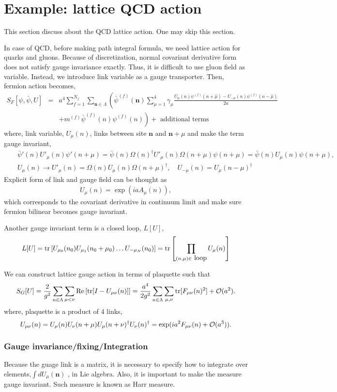\documentclass[10pt]{book}
\def\bm{\boldsymbol}
\newcommand{\bea}{\begin{eqnarray}}
\newcommand{\eea}{\end{eqnarray}}
\newcommand{\no}{\nonumber \\}
\begin{document}
\section{Example: lattice QCD action}
{\color{blue} This section discuss about the QCD lattice action. One may skip this section.}


In case of QCD, before making path integral formula, we need lattice action for quarks and
gluons. Because of discretization, normal covariant derivative form does not satisfy 
gauge invariance exactly. Thus, it is difficult to use gluon field as variable.
Instead, we introduce link variable as a gauge transporter. 
Then, fermion action becomes,
\bea 
S_F[\psi,\bar{\psi},U]&=&a^4\sum_{f=1}^{N_f}\sum_{{\bm n}\in \Lambda}
  \left( \bar{\psi}^{(f)}({\bm n})\sum_{\mu=1}^{4}\gamma_\mu 
  \frac{U_\mu(n) \psi^{(f)}(n+\hat{\mu})-U_{-\mu}(n) \psi^{(f)}(n-\hat{\mu})}{2a}
  \right.\no & &\left.
  +m^{(f)} \bar{\psi}^{(f)}(n)\psi^{(f)}(n)
  \right) +\mbox{ additional terms }
\eea  
where, link variable, $U_\mu(n)$, links between  site ${\bm n}$ and ${\bm n}+\mu$
and make the term gauge invariant,
\bea
& &\bar{\psi}'(n)U'_\mu(n)\psi'(n+\mu)=\bar{\psi}(n)\Omega(n)^\dagger U'_\mu(n)\Omega(n+\mu)
  \psi(n+\mu)=\bar{\psi}(n)U_\mu(n)\psi(n+\mu),\no 
& &U_\mu(n)\to U'_\mu(n)=\Omega(n)U_\mu(n)\Omega(n+\mu)^\dagger, \quad 
   U_{-\mu}(n)=U_\mu(n-\mu)^\dagger  
\eea 
Explicit form of link and gauge field can be thought as
\bea 
U_\mu(n)=\exp(ia A_\mu(n)),
\eea 
which corresponds to the covariant derivative in continuum limit
and make sure fermion bilinear becomes gauge invariant.

Another gauge invariant term is a closed loop, $L[U]$,
\bea
L[U]={\rm tr}\left[U_{\mu_{0}}(n_0)U_{\mu_1}(n_0+\mu_0)\dots U_{-\mu_{N}}(n_0) \right]
    ={\rm tr}\left[\prod_{(n,\mu)\in \mbox{ loop}} U_\mu(n)\right] 
\eea 

We can construct lattice gauge action in terms of plaquette such that
\bea 
S_G[U]=\frac{2}{g^2}\sum_{n\in\Lambda}\sum_{\mu<\nu}{\rm Re}\left[ {\rm tr}[I-U_{\mu\nu}(n)]\right] 
 =\frac{a^4}{2g^2}\sum_{n\in\Lambda}\sum_{\mu,\nu}{\rm tr}[F_{\mu\nu}(n)^2]+{\cal O}(a^2).
\eea 
where, plaquette is a product of 4 links,
\bea 
U_{\mu\nu}(n)=U_\mu(n)U_\nu(n+\mu)U_\mu(n+\nu)^\dagger U_\nu(n)^\dagger
 =\exp(ia^2 F_{\mu\nu}(n)+{\cal O}(a^3)). 
\eea 

\subsubsection{Gauge invariance/fixing/Integration}
Because the guage link is a matrix, it is necessary to specify how to integrate over 
elements,$\int d U_\mu({\bm n})$ ,  in Lie algebra. 
Also, it is important to make the measure gauge invariant.
Such measure is known as Harr measure. 
\end{document}
